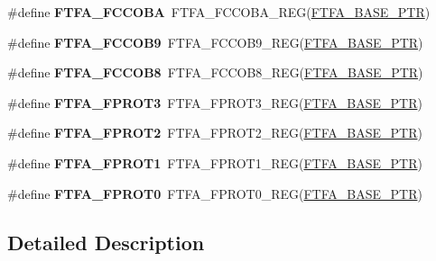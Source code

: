 \begin{DoxyCompactItemize}
\item 
\mbox{\label{group___f_t_f_a___register___accessor___macros_gab615a3efccdb43ad39d1fe99a8837548}} 
\#define {\bfseries F\+T\+F\+A\+\_\+\+F\+C\+C\+O\+BA}~F\+T\+F\+A\+\_\+\+F\+C\+C\+O\+B\+A\+\_\+\+R\+EG(\hyperlink{group___f_t_f_a___peripheral_ga13ad52f12d5b04e5e01f69ab18ed9216}{F\+T\+F\+A\+\_\+\+B\+A\+S\+E\+\_\+\+P\+TR})
\item 
\mbox{\label{group___f_t_f_a___register___accessor___macros_gaf1858d79d97a87b27aeb932b54195a58}} 
\#define {\bfseries F\+T\+F\+A\+\_\+\+F\+C\+C\+O\+B9}~F\+T\+F\+A\+\_\+\+F\+C\+C\+O\+B9\+\_\+\+R\+EG(\hyperlink{group___f_t_f_a___peripheral_ga13ad52f12d5b04e5e01f69ab18ed9216}{F\+T\+F\+A\+\_\+\+B\+A\+S\+E\+\_\+\+P\+TR})
\item 
\mbox{\label{group___f_t_f_a___register___accessor___macros_gaa6166f7f05e6719ca0d91a97ab1536eb}} 
\#define {\bfseries F\+T\+F\+A\+\_\+\+F\+C\+C\+O\+B8}~F\+T\+F\+A\+\_\+\+F\+C\+C\+O\+B8\+\_\+\+R\+EG(\hyperlink{group___f_t_f_a___peripheral_ga13ad52f12d5b04e5e01f69ab18ed9216}{F\+T\+F\+A\+\_\+\+B\+A\+S\+E\+\_\+\+P\+TR})
\item 
\mbox{\label{group___f_t_f_a___register___accessor___macros_ga3cd84173346f4c04334d79712af79883}} 
\#define {\bfseries F\+T\+F\+A\+\_\+\+F\+P\+R\+O\+T3}~F\+T\+F\+A\+\_\+\+F\+P\+R\+O\+T3\+\_\+\+R\+EG(\hyperlink{group___f_t_f_a___peripheral_ga13ad52f12d5b04e5e01f69ab18ed9216}{F\+T\+F\+A\+\_\+\+B\+A\+S\+E\+\_\+\+P\+TR})
\item 
\mbox{\label{group___f_t_f_a___register___accessor___macros_ga25a0859e528311bedda3719d80e44a59}} 
\#define {\bfseries F\+T\+F\+A\+\_\+\+F\+P\+R\+O\+T2}~F\+T\+F\+A\+\_\+\+F\+P\+R\+O\+T2\+\_\+\+R\+EG(\hyperlink{group___f_t_f_a___peripheral_ga13ad52f12d5b04e5e01f69ab18ed9216}{F\+T\+F\+A\+\_\+\+B\+A\+S\+E\+\_\+\+P\+TR})
\item 
\mbox{\label{group___f_t_f_a___register___accessor___macros_ga6fa22ad27ded5b2e13a5b6dd22d6641d}} 
\#define {\bfseries F\+T\+F\+A\+\_\+\+F\+P\+R\+O\+T1}~F\+T\+F\+A\+\_\+\+F\+P\+R\+O\+T1\+\_\+\+R\+EG(\hyperlink{group___f_t_f_a___peripheral_ga13ad52f12d5b04e5e01f69ab18ed9216}{F\+T\+F\+A\+\_\+\+B\+A\+S\+E\+\_\+\+P\+TR})
\item 
\mbox{\label{group___f_t_f_a___register___accessor___macros_gad1a0d6a372aec4a0f1b41e9f8d45f59b}} 
\#define {\bfseries F\+T\+F\+A\+\_\+\+F\+P\+R\+O\+T0}~F\+T\+F\+A\+\_\+\+F\+P\+R\+O\+T0\+\_\+\+R\+EG(\hyperlink{group___f_t_f_a___peripheral_ga13ad52f12d5b04e5e01f69ab18ed9216}{F\+T\+F\+A\+\_\+\+B\+A\+S\+E\+\_\+\+P\+TR})
\end{DoxyCompactItemize}


\subsection{Detailed Description}
